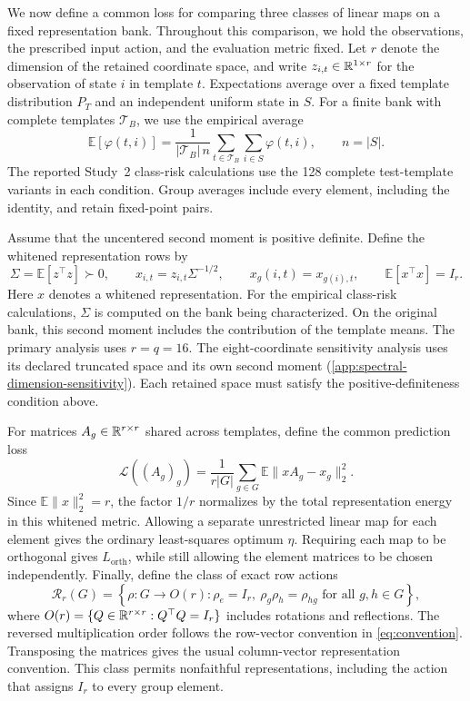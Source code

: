 We now define a common loss for comparing three classes of
linear maps on a fixed representation bank.
Throughout this comparison, we hold the observations, the
prescribed input action, and the evaluation metric fixed.
Let $r$ denote the dimension of the retained coordinate space,
and write $z_{i,t}\in\mathbb{R}^{1\times r}$ for the observation of
state $i$ in template $t$.
Expectations average over a fixed template distribution
$P_T$ and an independent uniform state in $S$.
For a finite bank with complete templates
$\mathcal T_B$, we use the empirical average
\[
 \mathbb E[\varphi(t,i)]
 =
 \frac{1}{|\mathcal T_B|\,n}
 \sum_{t\in\mathcal T_B}\sum_{i\in S}\varphi(t,i),
 \qquad n=|S|.
\]
The reported Study~2 class-risk calculations use the
128 complete test-template variants in each condition.
Group averages include every element, including the identity,
and retain fixed-point pairs.

Assume that the uncentered second moment is positive definite.
Define the whitened representation rows by
\[
 \Sigma=\mathbb E[z^\top z]\succ0,
 \qquad
 x_{i,t}=z_{i,t}\Sigma^{-1/2},
 \qquad
 x_g(i,t)=x_{g(i),t},
 \qquad
 \mathbb E[x^\top x]=I_r.
\]
Here $x$ denotes a whitened representation.
For the empirical class-risk calculations, $\Sigma$ is
computed on the bank being characterized.
On the original bank, this second moment includes the
contribution of the template means.
The primary analysis uses $r=q=16$.
The eight-coordinate sensitivity analysis uses its declared
truncated space and its own second moment
(\cref{app:spectral-dimension-sensitivity}).
Each retained space must satisfy the positive-definiteness
condition above.

For matrices $A_g\in\mathbb{R}^{r\times r}$ shared across templates,
define the common prediction loss
\begin{equation}
 \mathcal L((A_g)_g)
 =
 \frac{1}{r|G|}
 \sum_{g\in G}\mathbb E\|xA_g-x_g\|_2^2.
 \label{eq:class-loss-main}
\end{equation}
Since $\mathbb E\|x\|_2^2=r$, the factor $1/r$ normalizes
by the total representation energy in this whitened metric.
Allowing a separate unrestricted linear map for each element
gives the ordinary least-squares optimum $\eta$.
Requiring each map to be orthogonal gives
$L_{\mathrm{orth}}$, while still allowing the element
matrices to be chosen independently.
Finally, define the class of exact row actions
\[
 \mathcal R_r(G)
 =
 \left\{
 \rho:G\to O(r):
 \rho_e=I_r,\ 
 \rho_g\rho_h=\rho_{hg}
 \text{ for all }g,h\in G
 \right\},
\]
where
$O(r)=\{Q\in\mathbb{R}^{r\times r}:Q^\top Q=I_r\}$
includes rotations and reflections.
The reversed multiplication order follows the row-vector
convention in \cref{eq:convention}.
Transposing the matrices gives the usual column-vector
representation convention.
This class permits nonfaithful representations, including
the action that assigns $I_r$ to every group element.

